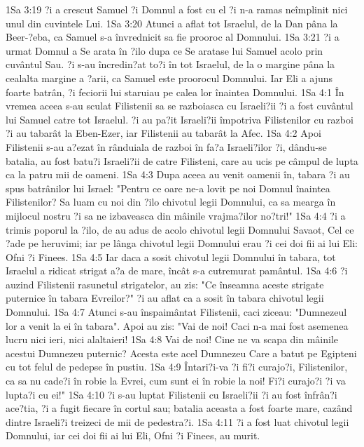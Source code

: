 1Sa 3:19  ?i a crescut Samuel ?i Domnul a fost cu el ?i n-a ramas neîmplinit nici unul din cuvintele Lui.
1Sa 3:20  Atunci a aflat tot Israelul, de la Dan pâna la Beer-?eba, ca Samuel s-a învrednicit sa fie prooroc al Domnului.
1Sa 3:21  ?i a urmat Domnul a Se arata în ?ilo dupa ce Se aratase lui Samuel acolo prin cuvântul Sau. ?i s-au încredin?at to?i în tot Israelul, de la o margine pâna la cealalta margine a ?arii, ca Samuel este proorocul Domnului. Iar Eli a ajuns foarte batrân, ?i feciorii lui staruiau pe calea lor înaintea Domnului.
1Sa 4:1  În vremea aceea s-au sculat Filistenii sa se razboiasca cu Israeli?ii ?i a fost cuvântul lui Samuel catre tot Israelul. ?i au pa?it Israeli?ii împotriva Filistenilor cu razboi ?i au tabarât la Eben-Ezer, iar Filistenii au tabarât la Afec.
1Sa 4:2  Apoi Filistenii s-au a?ezat în rânduiala de razboi în fa?a Israeli?ilor ?i, dându-se batalia, au fost batu?i Israeli?ii de catre Filisteni, care au ucis pe câmpul de lupta ca la patru mii de oameni.
1Sa 4:3  Dupa aceea au venit oamenii în, tabara ?i au spus batrânilor lui Israel: "Pentru ce oare ne-a lovit pe noi Domnul înaintea Filistenilor? Sa luam cu noi din ?ilo chivotul legii Domnului, ca sa mearga în mijlocul nostru ?i sa ne izbaveasca din mâinile vrajma?ilor no?tri!"
1Sa 4:4  ?i a trimis poporul la ?ilo, de au adus de acolo chivotul legii Domnului Savaot, Cel ce ?ade pe heruvimi; iar pe lânga chivotul legii Domnului erau ?i cei doi fii ai lui Eli: Ofni ?i Finees.
1Sa 4:5  Iar daca a sosit chivotul legii Domnului în tabara, tot Israelul a ridicat strigat a?a de mare, încât s-a cutremurat pamântul.
1Sa 4:6  ?i auzind Filistenii rasunetul strigatelor, au zis: "Ce înseamna aceste strigate puternice în tabara Evreilor?" ?i au aflat ca a sosit în tabara chivotul legii Domnului.
1Sa 4:7  Atunci s-au înspaimântat Filistenii, caci ziceau: "Dumnezeul lor a venit la ei în tabara". Apoi au zis: "Vai de noi! Caci n-a mai fost asemenea lucru nici ieri, nici alaltaieri!
1Sa 4:8  Vai de noi! Cine ne va scapa din mâinile acestui Dumnezeu puternic? Acesta este acel Dumnezeu Care a batut pe Egipteni cu tot felul de pedepse în pustiu.
1Sa 4:9  Întari?i-va ?i fi?i curajo?i, Filistenilor, ca sa nu cade?i în robie la Evrei, cum sunt ei în robie la noi! Fi?i curajo?i ?i va lupta?i cu ei!"
1Sa 4:10  ?i s-au luptat Filistenii cu Israeli?ii ?i au fost înfrân?i ace?tia, ?i a fugit fiecare în cortul sau; batalia aceasta a fost foarte mare, cazând dintre Israeli?i treizeci de mii de pedestra?i.
1Sa 4:11  ?i a fost luat chivotul legii Domnului, iar cei doi fii ai lui Eli, Ofni ?i Finees, au murit.
